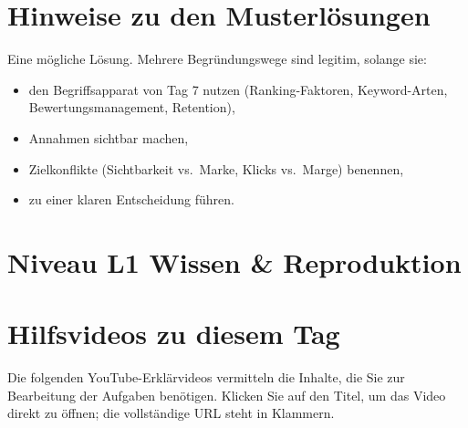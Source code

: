 \documentclass[11pt,a4paper,oneside]{article}
\begin{document}
\section*{Hinweise zu den Musterlösungen}
\thispagestyle{plain}

\noindent Eine mögliche Lösung. Mehrere Begründungswege sind legitim, solange sie:

\begin{itemize}
  \item den Begriffsapparat von Tag 7 nutzen (Ranking-Faktoren, Keyword-Arten, Bewertungsmanagement, Retention),
  \item Annahmen sichtbar machen,
  \item Zielkonflikte (Sichtbarkeit vs.\ Marke, Klicks vs.\ Marge) benennen,
  \item zu einer klaren Entscheidung führen.
\end{itemize}

\clearpage

\section*{Niveau L1 \textendash{} Wissen \& Reproduktion}

\section*{Hilfsvideos zu diesem Tag}
\thispagestyle{plain}

\noindent Die folgenden YouTube-Erkl\"arvideos vermitteln die Inhalte, die Sie zur Bearbeitung der Aufgaben ben\"otigen. Klicken Sie auf den Titel, um das Video direkt zu \"offnen; die vollst\"andige URL steht in Klammern.
\end{document}
